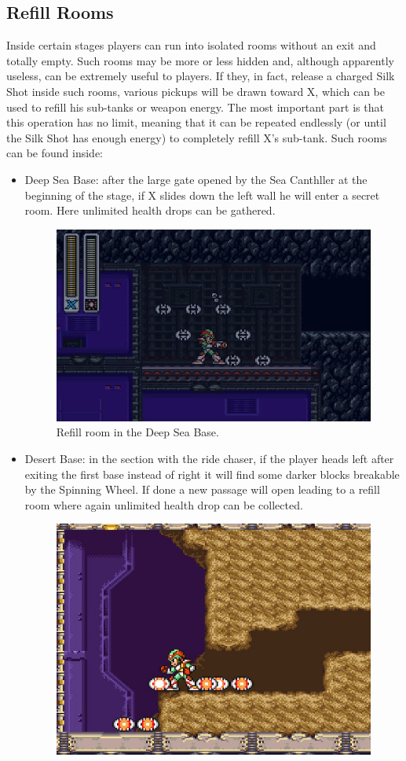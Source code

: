 \subsection{Refill Rooms}\label{sec:refill}
Inside certain stages players can run into isolated rooms without an exit and totally empty. Such rooms may be more or less hidden and, although apparently useless, can be extremely useful to players. If they, in fact, release a charged Silk Shot inside such rooms, various pickups will be drawn toward X, which can be used to refill his sub-tanks or weapon energy. The most important part is that this operation has no limit, meaning that it can be repeated endlessly (or until the Silk Shot has enough energy) to completely refill X's sub-tank. Such rooms can be found inside:
\begin{itemize}
	\item Deep Sea Base: after the large gate opened by the Sea Canthller at the beginning of the stage, if X slides down the left wall he will enter a secret room. Here unlimited health drops can be gathered.
	\begin{figure}[htp]
		\centering
		\includegraphics[width=.4\linewidth]{figures/X2/Bubble_crab/Crab_farming_spot.png}
		\caption{Refill room in the Deep Sea Base.}
	\end{figure}
	\item Desert Base: in the section with the ride chaser, if the player heads left after exiting the first base instead of right it will find some darker blocks breakable by the Spinning  Wheel. If done a new passage will open leading to a refill room where again unlimited health drop can be collected.
	\begin{figure}[htp]
		\centering
		\includegraphics[width=.4\linewidth]{figures/X2/Overdrive_ostrich/ostrich_refill.jpg}

\end{figure}
\end{itemize}
